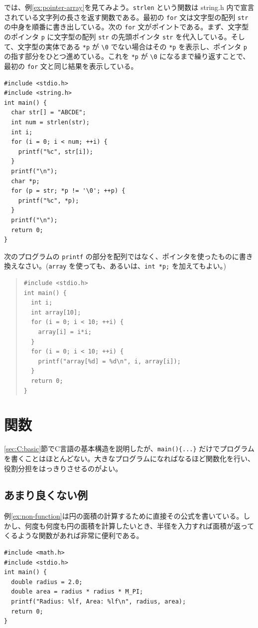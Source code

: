 では、例\ref{ex:pointer-array}を見てみよう。\verb|strlen| という関数は string.h 内で宣言されている文字列の長さを返す関数である。最初の \verb|for| 文は文字型の配列 \verb|str| の中身を順番に書き出している。次の \verb|for| 文がポイントである。まず、文字型のポインタ \verb|p| に文字型の配列 \verb|str| の先頭ポインタ \verb|str| を代入している。そして、文字型の実体である \verb|*p| が \verb|\0| でない場合はその \verb|*p| を表示し、ポインタ \verb|p| の指す部分をひとつ進めている。これを \verb|*p| が \verb|\0| になるまで繰り返すことで、最初の \verb|for| 文と同じ結果を表示している。
\begin{reidai}\label{ex:pointer-array}
\begin{verbatim}
#include <stdio.h>
#include <string.h>
int main() {
  char str[] = "ABCDE";
  int num = strlen(str);
  int i;
  for (i = 0; i < num; ++i) {
    printf("%c", str[i]);
  }
  printf("\n");
  char *p;
  for (p = str; *p != '\0'; ++p) {
    printf("%c", *p);
  }
  printf("\n");
  return 0;
}
\end{verbatim}
\end{reidai}

\begin{renshuu}\label{prob:5-1}
次のプログラムの \verb|printf| の部分を配列ではなく、ポインタを使ったものに書き換えなさい。(\verb|array| を使っても、あるいは、\verb|int *p;| を加えてもよい。)

\begin{quote}
\begin{verbatim}
#include <stdio.h>
int main() {
  int i;
  int array[10];
  for (i = 0; i < 10; ++i) {
    array[i] = i*i;
  }
  for (i = 0; i < 10; ++i) {
    printf("array[%d] = %d\n", i, array[i]);
  }
  return 0;
}
\end{verbatim}
\end{quote}
\end{renshuu}

\section{関数}
\label{sec:C:function}

\ref{sec:C:basic}節でC言語の基本構造を説明したが、\verb|main(){...}| だけでプログラムを書くことはほとんどない。大きなプログラムになればなるほど関数化を行い、役割分担をはっきりさせるのがよい。

\subsection{あまり良くない例}
例\ref{ex:non-function}は円の面積の計算するために直接その公式を書いている。しかし、何度も何度も円の面積を計算したいとき、半径を入力すれば面積が返ってくるような関数があれば非常に便利である。
\begin{reidai}\label{ex:non-function}
\begin{verbatim}
#include <math.h>
#include <stdio.h>
int main() {
  double radius = 2.0;
  double area = radius * radius * M_PI;
  printf("Radius: %lf, Area: %lf\n", radius, area);
  return 0;
}
\end{verbatim}
\end{reidai}


